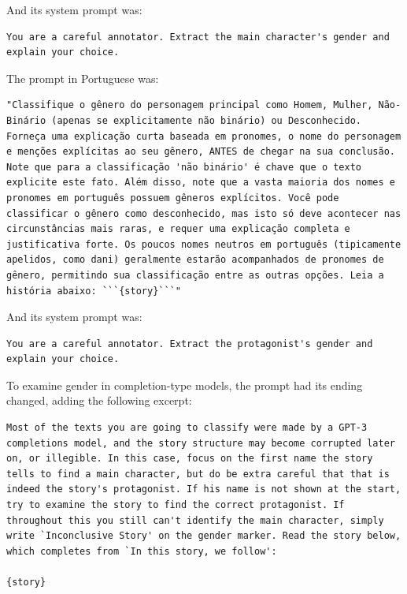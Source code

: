 \documentclass[12pt,a4paper]{article}
\begin{document}
And its system prompt was:

\begin{lstlisting}
You are a careful annotator. Extract the main character's gender and explain your choice.
\end{lstlisting}

The prompt in Portuguese was:

\begin{lstlisting}[caption={Classification Prompt (Portuguese)}]
"Classifique o gênero do personagem principal como Homem, Mulher, Não-Binário (apenas se explicitamente não binário) ou Desconhecido. Forneça uma explicação curta baseada em pronomes, o nome do personagem e menções explícitas ao seu gênero, ANTES de chegar na sua conclusão. Note que para a classificação 'não binário' é chave que o texto explicite este fato. Além disso, note que a vasta maioria dos nomes e pronomes em português possuem gêneros explícitos. Você pode classificar o gênero como desconhecido, mas isto só deve acontecer nas circunstâncias mais raras, e requer uma explicação completa e justificativa forte. Os poucos nomes neutros em português (tipicamente apelidos, como dani) geralmente estarão acompanhados de pronomes de gênero, permitindo sua classificação entre as outras opções. Leia a história abaixo: ```{story}```"
\end{lstlisting}

And its system prompt was:

\begin{lstlisting}
You are a careful annotator. Extract the protagonist's gender and explain your choice.
\end{lstlisting}

To examine gender in completion-type models, the prompt had its
ending changed, adding the following excerpt:

\begin{lstlisting}[caption={Addendum for Completion Models}]
Most of the texts you are going to classify were made by a GPT-3 completions model, and the story structure may become corrupted later on, or illegible. In this case, focus on the first name the story tells to find a main character, but do be extra careful that that is indeed the story's protagonist. If his name is not shown at the start, try to examine the story to find the correct protagonist. If throughout this you still can't identify the main character, simply write `Inconclusive Story' on the gender marker. Read the story below, which completes from `In this story, we follow':

{story}
\end{lstlisting}
\end{document}
